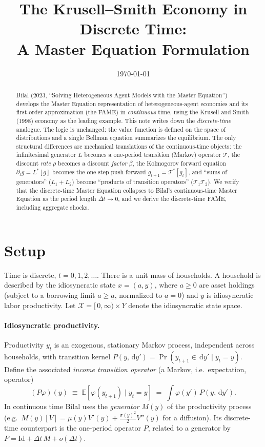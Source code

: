 \documentclass[11pt]{article}
\title{The Krusell--Smith Economy in Discrete Time:\\ A Master Equation Formulation}
\author{}
\date{\today}
\newcommand{\E}{\mathbb{E}}
\newcommand{\X}{\mathcal{X}}
\newcommand{\Tr}{\mathcal{T}}
\newcommand{\Tstar}{\mathcal{T}^{*}}
\newcommand{\dd}{\,\mathrm{d}}
\begin{document}
\maketitle

\begin{abstract}
Bilal (2023, ``Solving Heterogeneous Agent Models with the Master Equation'')
develops the Master Equation representation of heterogeneous-agent economies and
its first-order approximation (the FAME) in \emph{continuous} time, using the
Krusell and Smith (1998) economy as the leading example. This note writes down
the \emph{discrete-time} analogue. The logic is unchanged: the value function is
defined on the space of distributions and a single Bellman equation summarizes
the equilibrium. The only structural differences are mechanical translations of
the continuous-time objects: the infinitesimal generator $L$ becomes a one-period
transition (Markov) operator $\Tr$, the discount \emph{rate} $\rho$ becomes a
discount \emph{factor} $\beta$, the Kolmogorov forward equation
$\partial_t g = L^{*}[g]$ becomes the one-step push-forward $g_{t+1}=\Tstar[g_t]$,
and ``sums of generators'' ($L_1+L_2$) become ``products of transition operators''
($\Tr_1\Tr_2$). We verify that the discrete-time Master Equation collapses to
Bilal's continuous-time Master Equation as the period length $\Delta t\to 0$, and
we derive the discrete-time FAME, including aggregate shocks.
\end{abstract}

\tableofcontents

\section{Setup}

Time is discrete, $t=0,1,2,\dots$. There is a unit mass of households. A household
is described by the idiosyncratic state $x=(a,y)$, where $a\ge 0$ are asset holdings
(subject to a borrowing limit $a\ge\underline a$, normalized to $\underline a=0$)
and $y$ is idiosyncratic labor productivity. Let $\X=[\,0,\infty)\times Y$ denote
the idiosyncratic state space.

\paragraph{Idiosyncratic productivity.}
Productivity $y_t$ is an exogenous, stationary Markov process, independent across
households, with transition kernel $P(y,\dd y')=\Pr(y_{t+1}\in\dd y'\mid y_t=y)$.
Define the associated \emph{income transition operator} (a Markov, i.e.\ expectation,
operator)
\[
  (P\varphi)(y)\;\equiv\;\E\!\left[\varphi(y_{t+1})\mid y_t=y\right]
  \;=\;\int \varphi(y')\,P(y,\dd y').
\]
In continuous time Bilal uses the \emph{generator} $M(y)$ of the productivity
process (e.g.\ $M(y)[V]=\mu(y)V'(y)+\tfrac{\sigma(y)^2}{2}V''(y)$ for a diffusion).
Its discrete-time counterpart is the one-period operator $P$, related to a generator
by $P=\mathrm{Id}+\Delta t\,M+o(\Delta t)$.
\end{document}
